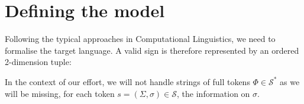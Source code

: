 
\section{Defining the model}
\label{sec:model}

Following the typical approaches in Computational Linguistics, we need to formalise the target language.
A valid sign is therefore represented by an ordered 2-dimension tuple:

In the context of our effort, we will not handle strings of full tokens $\Phi \in \mathcal{S}^\ast$ as we will
be missing, for each token $s = (\Sigma, \sigma) \in \mathcal{S}$, the information on $\sigma$.

